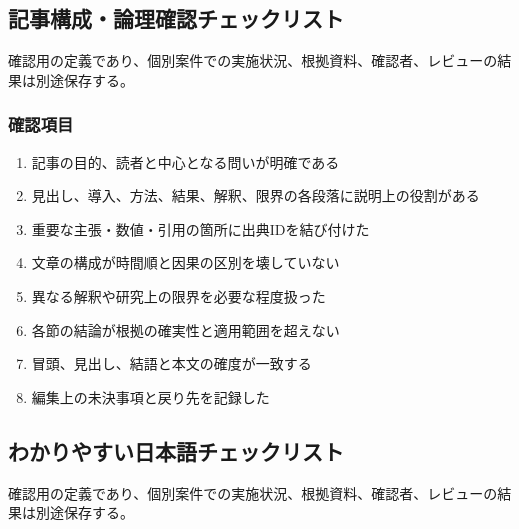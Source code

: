 \documentclass[a4paper,11pt]{article}
\begin{document}
\subsection{記事構成・論理確認チェックリスト}
\par 確認用の定義であり、個別案件での実施状況、根拠資料、確認者、レビューの結果は別途保存する。\par\medskip
\subsubsection*{確認項目}
\begin{enumerate}[leftmargin=2em,itemsep=0.3em]
\item 記事の目的、読者と中心となる問いが明確である\par
\item 見出し、導入、方法、結果、解釈、限界の各段落に説明上の役割がある\par
\item 重要な主張・数値・引用の箇所に出典IDを結び付けた\par
\item 文章の構成が時間順と因果の区別を壊していない\par
\item 異なる解釈や研究上の限界を必要な程度扱った\par
\item 各節の結論が根拠の確実性と適用範囲を超えない\par
\item 冒頭、見出し、結語と本文の確度が一致する\par
\item 編集上の未決事項と戻り先を記録した\par
\end{enumerate}
\subsection{わかりやすい日本語チェックリスト}
\par 確認用の定義であり、個別案件での実施状況、根拠資料、確認者、レビューの結果は別途保存する。\par\medskip
\end{document}
